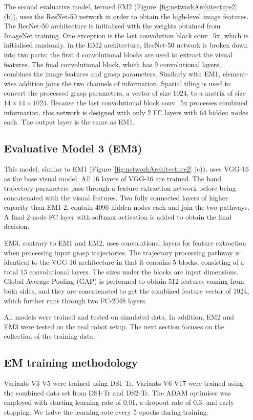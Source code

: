 The second evaluative model, termed EM2 (Figure~\ref{fig:networkArchitecture2} (b)), uses the ResNet-50 network in order to obtain the high-level image features. The ResNet-50 architecture is initialised with the weights obtained from ImageNet training. One exception is the last convolution block conv\_5x, which is initialised randomly. In the EM2 architecture, ResNet-50 network is broken down into two parts: the first 4 convolutional blocks are used to extract the visual features. The final convolutional block, which has 9 convolutional layers, combines the image features and grasp parameters. Similarly with EM1, element-wise addition joins the two channels of information. Spatial tiling is used to convert the processed grasp parameters, a vector of size $1024$, to a matrix of size $14 \times 14 \times 1024$. Because the last convolutional block conv\_5x processes combined information, this network is designed with only 2 FC layers with 64 hidden nodes each. The output layer is the same as EM1. 

\subsection{Evaluative Model 3 (EM3)}

This model, similar to EM1 (Figure~\ref{fig:networkArchitecture2} (c)), uses VGG-16 as the base visual model. All 16 layers of VGG-16 are trained. The hand trajectory parameters pass through a feature extraction network before being concatenated with the visual features. Two fully connected layers of higher capacity than EM1-2, contain 4096 hidden nodes each and join the two pathways. A final 2-node FC layer with softmax activation is added to obtain the final decision.

EM3, contrary to EM1 and EM2, uses convolutional layers for feature extraction when processing input grasp trajectories. The trajectory processing pathway is identical to the VGG-16 architecture in that it contains 5 blocks, consisting of a total 13 convolutional layers. The sizes under the blocks are input dimensions. Global Average Pooling (GAP) is performed to obtain 512 features coming from both sides, and they are concatenated to get the combined feature vector of 1024, which further runs through two FC-2048 layers.

All models were trained and tested on simulated data. In addition, EM2 and EM3 were tested on the real robot setup. The next section focuses on the collection of the training data.

\subsection{EM training methodology}
Variants V3-V5 were trained using DS1-Tr. Variants V6-V17 were trained using the combined data set from DS1-Tr and DS2-Tr. The ADAM optimiser was employed with starting learning rate of 0.01, a dropout rate of 0.3, and early stopping. We halve the learning rate every 5 epochs during training.

